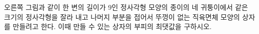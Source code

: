 \noindent\begin{minipage}[t]{0.58\linewidth}\vspace{0pt}\raggedright 오른쪽 그림과 같이 한 변의 길이가 9인 정사각형 모양의 종이의 네 귀퉁이에서 같은 크기의 정사각형을 잘라 내고 나머지 부분을 접어서 뚜껑이 없는 직육면체 모양의 상자를 만들려고 한다. 이때 만들 수 있는 상자의 부피의 최댓값을 구하시오.\end{minipage}\hfill\begin{minipage}[t]{0.4\linewidth}\vspace{0pt}\centering \resizebox{\ifdim\width>\linewidth\linewidth\else\width\fi}{!}{}\end{minipage}\par
